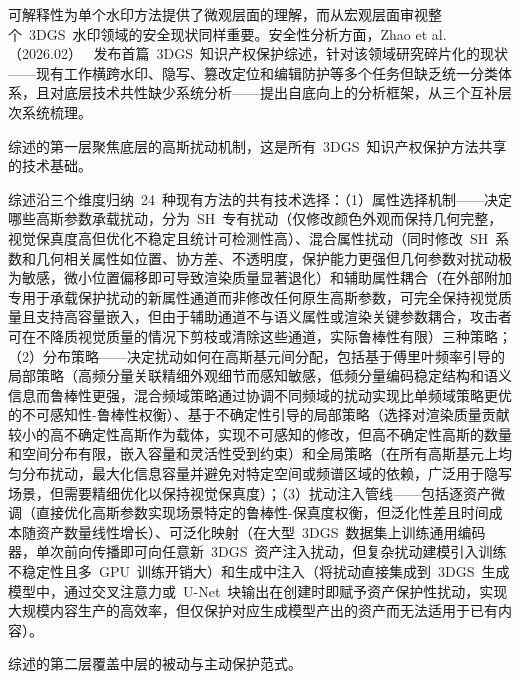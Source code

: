 可解释性为单个水印方法提供了微观层面的理解，而从宏观层面审视整个~3DGS~水印领域的安全现状同样重要。安全性分析方面，Zhao et al.（2026.02）~\cite{2602_03878} 发布首篇~3DGS~知识产权保护综述，针对该领域研究碎片化的现状——现有工作横跨水印、隐写、篡改定位和编辑防护等多个任务但缺乏统一分类体系，且对底层技术共性缺少系统分析——提出自底向上的分析框架，从三个互补层次系统梳理。

综述的第一层聚焦底层的高斯扰动机制，这是所有~3DGS~知识产权保护方法共享的技术基础。

综述沿三个维度归纳~24~种现有方法的共有技术选择：（1）属性选择机制——决定哪些高斯参数承载扰动，分为~SH~专有扰动（仅修改颜色外观而保持几何完整，视觉保真度高但优化不稳定且统计可检测性高）、混合属性扰动（同时修改~SH~系数和几何相关属性如位置、协方差、不透明度，保护能力更强但几何参数对扰动极为敏感，微小位置偏移即可导致渲染质量显著退化）和辅助属性耦合（在外部附加专用于承载保护扰动的新属性通道而非修改任何原生高斯参数，可完全保持视觉质量且支持高容量嵌入，但由于辅助通道不与语义属性或渲染关键参数耦合，攻击者可在不降质视觉质量的情况下剪枝或清除这些通道，实际鲁棒性有限）三种策略；（2）分布策略——决定扰动如何在高斯基元间分配，包括基于傅里叶频率引导的局部策略（高频分量关联精细外观细节而感知敏感，低频分量编码稳定结构和语义信息而鲁棒性更强，混合频域策略通过协调不同频域的扰动实现比单频域策略更优的不可感知性-鲁棒性权衡）、基于不确定性引导的局部策略（选择对渲染质量贡献较小的高不确定性高斯作为载体，实现不可感知的修改，但高不确定性高斯的数量和空间分布有限，嵌入容量和灵活性受到约束）和全局策略（在所有高斯基元上均匀分布扰动，最大化信息容量并避免对特定空间或频谱区域的依赖，广泛用于隐写场景，但需要精细优化以保持视觉保真度）；（3）扰动注入管线——包括逐资产微调（直接优化高斯参数实现场景特定的鲁棒性-保真度权衡，但泛化性差且时间成本随资产数量线性增长）、可泛化映射（在大型~3DGS~数据集上训练通用编码器，单次前向传播即可向任意新~3DGS~资产注入扰动，但复杂扰动建模引入训练不稳定性且多~GPU~训练开销大）和生成中注入（将扰动直接集成到~3DGS~生成模型中，通过交叉注意力或~U-Net~块输出在创建时即赋予资产保护性扰动，实现大规模内容生产的高效率，但仅保护对应生成模型产出的资产而无法适用于已有内容）。

综述的第二层覆盖中层的被动与主动保护范式。

